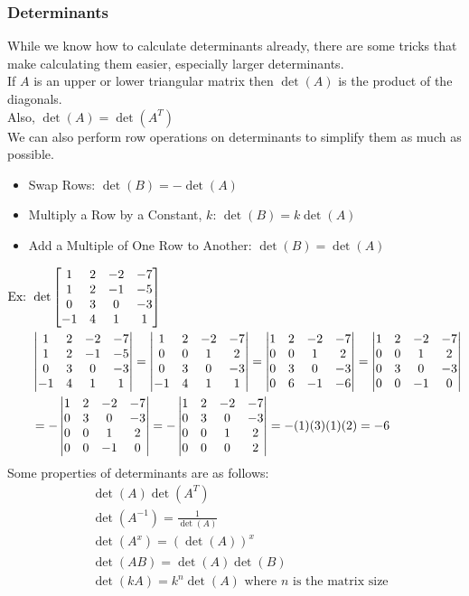 \documentclass[11pt, fleqn]{article}
\begin{document}
\subsubsection{Determinants}
While we know how to calculate determinants already, there are some tricks that make calculating them easier, especially larger determinants.\\
If $A$ is an upper or lower triangular matrix then $\det(A)$ is the product of the diagonals.\\
Also, $\det(A)=\det(A^T)$\\
We can also perform row operations on determinants to simplify them as much as possible.
\begin{itemize}
    \item Swap Rows: $\det(B)=-\det(A)$
    \item Multiply a Row by a Constant, $k$: $\det(B)=k\det(A)$
    \item Add a Multiple of One Row to Another: $\det(B)=\det(A)$
\end{itemize}
\begin{align*}
    \text{Ex: }&\det\matrixx{1&2&-2&-7\\1&2&-1&-5\\0&3&0&-3\\-1&4&1&1}\\
    &\detmatrix{1&2&-2&-7\\1&2&-1&-5\\0&3&0&-3\\-1&4&1&1}=\detmatrix{1&2&-2&-7\\0&0&1&2\\0&3&0&-3\\-1&4&1&1}=\detmatrix{1&2&-2&-7\\0&0&1&2\\0&3&0&-3\\0&6&-1&-6}=\detmatrix{1&2&-2&-7\\0&0&1&2\\0&3&0&-3\\0&0&-1&0}\\
    &=-\detmatrix{1&2&-2&-7\\0&3&0&-3\\0&0&1&2\\0&0&-1&0}=-\detmatrix{1&2&-2&-7\\0&3&0&-3\\0&0&1&2\\0&0&0&2}=-(1)(3)(1)(2)=-6
\end{align*}
Some properties of determinants are as follows:
\begin{align*}
    &\det(A)\det(A^T)\\
    &\det(A^{-1})=\frac{1}{\det(A)}\\
    &\det(A^x)=(\det(A))^x\\
    &\det(AB)=\det(A)\det(B)\\
    &\det(kA)=k^n\det(A)\text{ where $n$ is the matrix size}
\end{align*}
\end{document}
